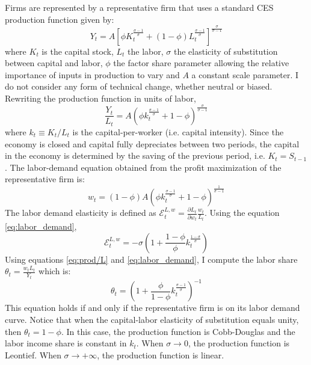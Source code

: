 Firms are represented by a representative firm that uses a standard CES production function given by:
	\begin{equation}\label{eq:prod}
	Y_t = A\left[ \phi K_t^{\frac{\sigma - 1}{\sigma}} + (1-\phi) L_t^{\frac{\sigma - 1}{\sigma}}\right]^{\frac{\sigma}{\sigma-1}}
	\end{equation}
where $K_t$ is the capital stock, $L_t$ the labor, $\sigma$ the elasticity of substitution between capital and labor, $\phi$ the factor share parameter allowing the relative importance of inputs in production to vary and $A$ a constant scale parameter. I do not consider any form of technical change, whether neutral or biased. Rewriting the production function in units of labor,
	\begin{equation}\label{eq:prod/L}
	\frac{Y_t}{L_t} = A\left(\phi k_t^{\frac{\sigma-1}{\sigma}} + 1-\phi\right)^{\frac{\sigma}{\sigma-1}}
	\end{equation}
where $k_t\equiv K_t/L_t$ is the capital-per-worker (i.e. capital intensity). Since the economy is closed and capital fully depreciates between two periods, the capital in the economy is determined by the saving of the previous period, i.e. $K_t = S_{t-1}$. The labor-demand equation obtained from the profit maximization of the representative firm is:
	\begin{equation}\label{eq:labor_demand}
	w_t = (1-\phi)A\left(\phi k_t^{\frac{\sigma-1}{\sigma}}+1-\phi\right)^{\frac{1}{\sigma-1}}
	\end{equation}
The labor demand elasticity is defined as $\mathcal{E}^{L,w}_t=\frac{\partial L_t}{\partial w_t}\frac{w_t}{L_t}$. Using the equation \eqref{eq:labor_demand},
	\begin{equation}\label{eq:labor_elasticity}
	\mathcal{E}^{L,w}_t = -\sigma\left(1+\frac{1-\phi}{\phi}k_t^{\frac{1-\sigma}{\sigma}}\right)
	\end{equation}
Using equations \eqref{eq:prod/L} and \eqref{eq:labor_demand}, I compute the labor share $\theta_t = \frac{w_tL_t}{Y_t}$ which is:
	\begin{equation}\label{eq:theta}
	\theta_t = \left(1+\frac{\phi}{1-\phi}k_t^{\frac{\sigma-1}{\sigma}}\right)^{-1}
	\end{equation}
This equation holds if and only if the representative firm is on its labor demand curve. Notice that when the capital-labor elasticity of substitution equals unity, then $\theta_t=1-\phi$. In this case, the production function is Cobb-Douglas and the labor income share is constant in $k_t$.  When $\sigma \to 0$, the production function is Leontief. When $\sigma \to +\infty$, the production function is linear. 
